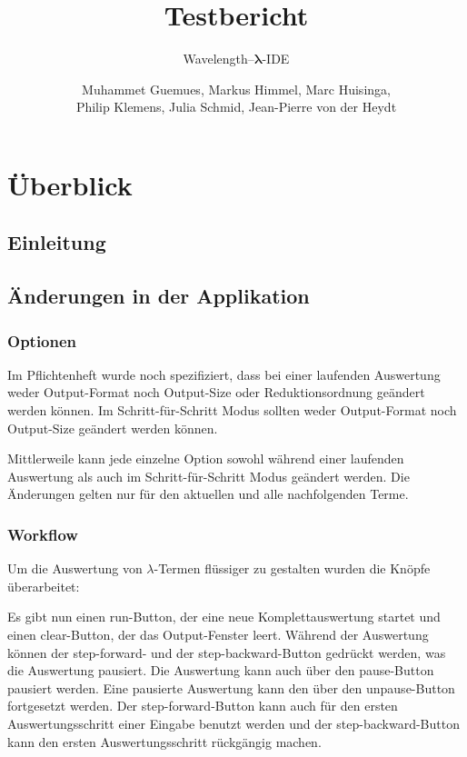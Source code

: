 \documentclass[parskip=full,11pt,openany]{scrreprt}
\title{Testbericht}
\subtitle{Wavelength--$\bm{\lambda}$-IDE}
\author{Muhammet Guemues, Markus Himmel, Marc Huisinga,\\Philip Klemens, Julia Schmid, Jean-Pierre von der Heydt}
\begin{document}
\maketitle
\newpage
\tableofcontents
\newpage

\chapter{Überblick}

\section{Einleitung}

\section{Änderungen in der Applikation}
\subsection{Optionen}
Im Pflichtenheft wurde noch spezifiziert, dass bei einer laufenden Auswertung weder Output-Format noch Output-Size
oder Reduktionsordnung geändert werden können. Im Schritt-für-Schritt Modus sollten weder Output-Format noch
Output-Size geändert werden können. 

Mittlerweile kann jede einzelne Option sowohl während einer laufenden Auswertung als auch im Schritt-für-Schritt Modus
geändert werden. Die Änderungen gelten nur für den aktuellen und alle nachfolgenden Terme.

\subsection{Workflow}
Um die Auswertung von $\lambda$-Termen flüssiger zu gestalten wurden die Knöpfe überarbeitet:

Es gibt nun einen run-Button, der eine neue Komplettauswertung startet und einen clear-Button, der das Output-Fenster leert.
Während der Auswertung können der step-forward- und der step-backward-Button gedrückt werden, was die Auswertung pausiert. 
Die Auswertung kann auch über den pause-Button pausiert werden.
Eine pausierte Auswertung kann den über den unpause-Button fortgesetzt werden.
Der step-forward-Button kann auch für den ersten Auswertungsschritt einer Eingabe benutzt werden und der step-backward-Button
kann den ersten Auswertungsschritt rückgängig machen.
\end{document}
